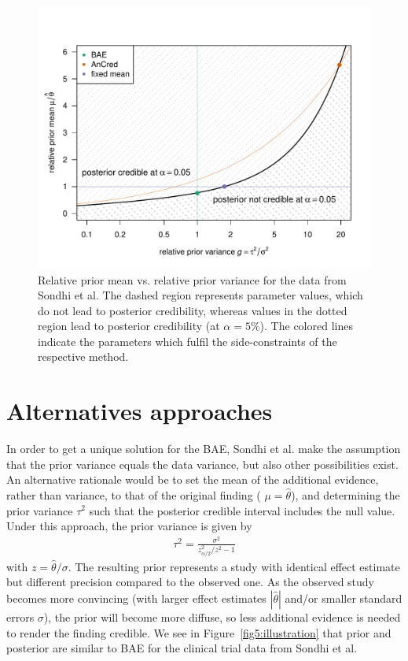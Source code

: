 \begin{figure}[!htb]
\begin{knitrout}
\color{fgcolor}
\includegraphics[width=\maxwidth]{images/paper5/plot-2d-1}
\end{knitrout}
\caption{Relative prior mean vs. relative prior variance for the data from
  Sondhi et al. The dashed region represents parameter values, which do not lead
  to posterior credibility, whereas values in the dotted region lead to
  posterior credibility (at $\alpha = 5\%$). The
  colored lines indicate the parameters which fulfil the side-constraints of the
  respective method.}
\label{fig5:priospace}
\end{figure}

\section{Alternatives approaches}
In order to get a unique solution for the BAE, Sondhi et al. make the assumption
that the prior variance equals the data variance, but also other possibilities
exist. An alternative rationale would be to set the mean of the additional
evidence, rather than variance, to that of the original finding (\ie{}
$\mu = \hat{\theta}$), and determining the prior variance $\tau^{2}$ such that
the posterior credible interval includes the null value. Under this approach,
the prior variance is given by
\begin{align*}
  \tau^{2} = \frac{\sigma^{2}}{z_{\scriptscriptstyle \alpha/2}^2/z^2 - 1}
\end{align*}
with $z = \hat{\theta}/\sigma$. The resulting prior represents a study with
identical effect estimate but different precision compared to the observed one.
As the observed study becomes more convincing (with larger effect estimates
$|\hat{\theta}|$ and/or smaller standard errors $\sigma$), the prior will become
more diffuse, so less additional evidence is needed to render the finding
credible. We see in Figure~\ref{fig5:illustration} that prior and posterior are
similar to BAE for the clinical trial data from Sondhi et al.


